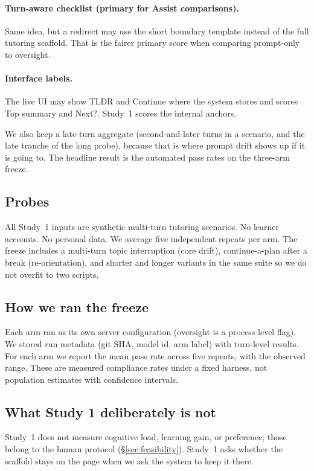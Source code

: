 \paragraph{Turn-aware checklist (primary for Assist comparisons).}
Same idea, but a redirect may use the short boundary template instead of the
full tutoring scaffold. That is the fairer primary score when comparing
prompt-only to oversight.

\paragraph{Interface labels.}
The live UI may show TLDR and Continue where the system stores and scores Top
summary and Next?. Study~1 scores the internal anchors.

We also keep a late-turn aggregate (second-and-later turns in a scenario, and
the late tranche of the long probe), because that is where prompt drift shows
up if it is going to. The headline result is the automated pass rates on the
three-arm freeze.

\subsection{Probes}

All Study~1 inputs are synthetic multi-turn tutoring scenarios. No learner
accounts. No personal data. We average five independent repeats per arm. The
freeze includes a multi-turn topic interruption (core drift), continue-a-plan
after a break (re-orientation), and shorter and longer variants in the same
suite so we do not overfit to two scripts.

\subsection{How we ran the freeze}

Each arm ran as its own server configuration (oversight is a process-level
flag). We stored run metadata (git SHA, model id, arm label) with turn-level
results. For each arm we report the mean pass rate across five repeats, with
the observed range. These are measured compliance rates under a fixed harness,
not population estimates with confidence intervals.

\subsection{What Study 1 deliberately is not}

Study~1 does not measure cognitive load, learning gain, or preference; those
belong to the human protocol (\S\ref{sec:feasibility}). Study~1 asks whether
the scaffold stays on the page when we ask the system to keep it there.

